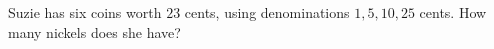 Suzie has six coins worth $23$ cents, using denominations $1,5,10,25$ cents. How many nickels does she have?
